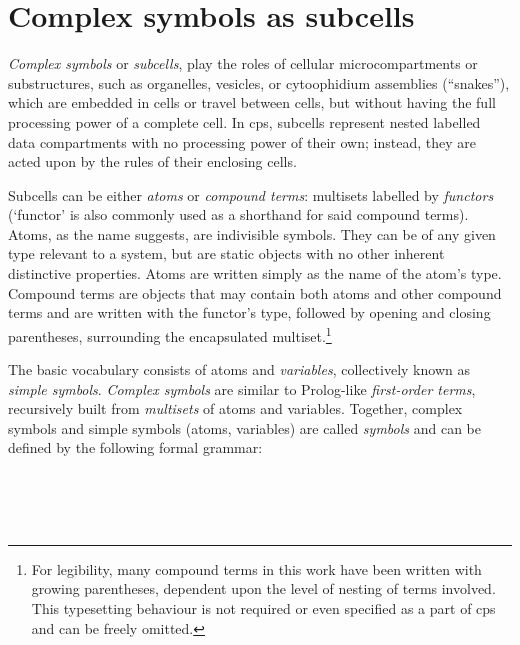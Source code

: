 \section{Complex symbols as subcells}

\emph{Complex symbols} or \emph{subcells}, 
play the roles of cellular microcompartments or substructures,
such as organelles, vesicles, or cytoophidium assemblies (``snakes''),
which are embedded in cells or travel between cells, 
but without having the full processing power of a complete cell.
In \gls{cps}, subcells represent nested labelled data compartments
with no processing power of their own;
instead, they are acted upon by the rules of their enclosing cells.

Subcells can be either \emph{atoms} or \emph{compound terms}: multisets labelled by \emph{functors} (`functor' is also commonly used as a shorthand for said compound terms).  Atoms, as the name suggests, are indivisible symbols.  They can be of any given type relevant to a system, but are static objects with no other inherent distinctive properties.  Atoms are written simply as the name of the atom's type.  Compound terms are objects that may contain both atoms and other compound terms and are written with the functor's type, followed by opening and closing parentheses, surrounding the encapsulated multiset.\footnote{For legibility, many compound terms in this work have been written with growing parentheses, dependent upon the level of nesting of terms involved.  This typesetting behaviour is not required or even specified as a part of \gls{cps} and can be freely omitted.}

The basic vocabulary consists of atoms and \emph{variables}, collectively known as \emph{simple symbols}.  \emph{Complex symbols} are similar to Prolog-like \emph{first-order terms}, recursively built from \emph{multisets} of atoms and variables.  Together, complex symbols and simple symbols (atoms, variables) are called \emph{symbols} and can be defined by the following formal grammar:

\begin{framed}
\vspace{-0.6cm}
\begin{small}
\begin{bnf*}
    \\
    \\
    \\
\end{bnf*}
\end{small}
\vspace{-0.8cm}
\end{framed}

